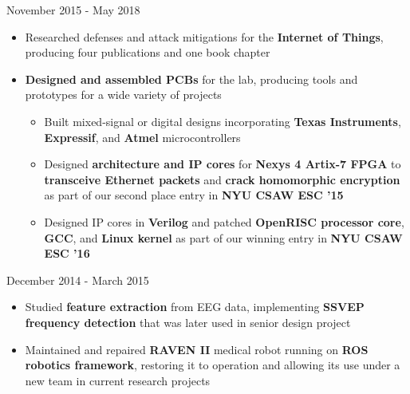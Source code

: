 \documentclass{my_resume}
\begin{document}
    {November 2015 - May 2018}
\begin{flushleft}
\begin{itemize}[noitemsep]
  \item Researched defenses and attack mitigations for the \textbf{Internet of Things}, producing four publications and one book chapter
  \item \textbf{Designed and assembled PCBs} for the lab, producing tools and prototypes for a wide variety of projects
  \begin{itemize}[noitemsep]
    \item Built mixed-signal or digital designs incorporating \textbf{Texas Instruments}, \textbf{Expressif}, and \textbf{Atmel} microcontrollers
    \item Designed \textbf{architecture and IP cores} for \textbf{Nexys 4 Artix-7 FPGA} to \textbf{transceive Ethernet packets} and \textbf{crack homomorphic encryption} as part of our second place entry in \textbf{NYU CSAW ESC '15}
    \item Designed IP cores in \textbf{Verilog} and patched \textbf{OpenRISC processor core}, \textbf{GCC}, and \textbf{Linux kernel} as part of our winning entry in \textbf{NYU CSAW ESC '16}
  \end{itemize}
\end{itemize}
\end{flushleft}
	{December 2014 - March 2015}
\begin{flushleft}
\begin{itemize}[noitemsep]
  \item Studied \textbf{feature extraction} from EEG data, implementing \textbf{SSVEP frequency detection} that was later used in senior design project
  \item Maintained and repaired \textbf{RAVEN II} medical robot running on \textbf{ROS robotics framework}, restoring it to operation and allowing its use under a new team in current research projects
\end{itemize}
\end{flushleft}
\end{document}
